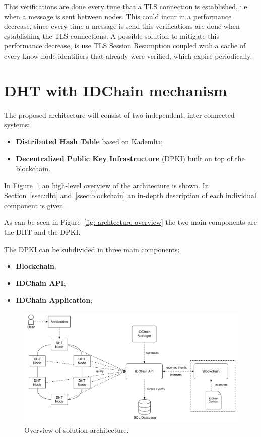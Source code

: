 This verifications are done every time that a TLS connection is established, i.e when a message is sent between nodes.
This could incur in a performance decrease, since every time a message is send this verifications are done when establishing the TLS connections.
A possible solution to mitigate this performance decrease, is use TLS Session Resumption coupled with a cache of every know node identifiers that already were verified, which expire periodically.


\section{DHT with IDChain mechanism}\label{architecture:idchain-overview}

The proposed architecture will consist of two independent, inter-connected systems:

\begin{itemize}
	\item \textbf{Distributed Hash Table} based on Kademlia;
	\item \textbf{Decentralized Public Key Infrastructure} (DPKI) built on top of the blockchain.
\end{itemize}


In Figure~\ref{fig:architecture-overview} an high-level overview of the architecture is shown.
In Section~\ref{ssec:dht} and~\ref{ssec:blockchain} an in-depth description of each individual component is given.

As can be seen in Figure~\ref{fig: archtecture-overview} the two main components are the \ac{DHT} and the \ac{DPKI}.

The DPKI can be subdivided in three main components:
\begin{itemize}
	\item \textbf{Blockchain};
	\item \textbf{IDChain API};
	\item \textbf{IDChain Application};
\end{itemize}

\begin{figure}
  \includegraphics[width=\linewidth]{Figures/architecture-overview.pdf}
    \caption{Overview of solution architecture.}
\label{fig:architecture-overview}
\end{figure}

